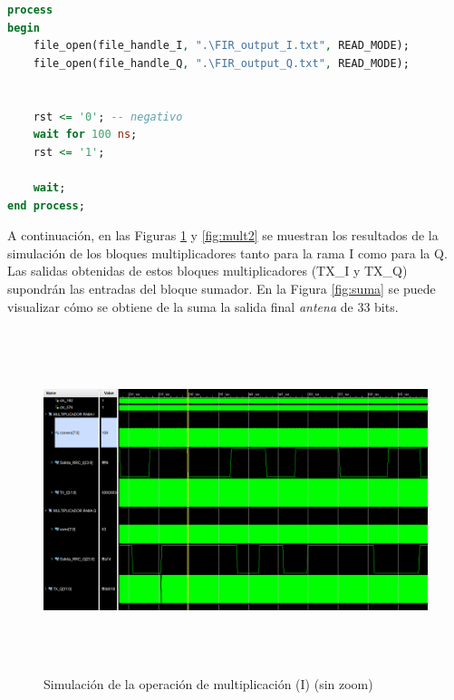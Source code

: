 \vspace{3mm}

\begin{lstlisting}[language=VHDL, style=mystyle, caption={Proceso de estimulación}]
process
begin
    file_open(file_handle_I, ".\FIR_output_I.txt", READ_MODE);
    file_open(file_handle_Q, ".\FIR_output_Q.txt", READ_MODE);
  
  
    rst <= '0'; -- negativo
    wait for 100 ns;
    rst <= '1';               

    wait;
end process;
\end{lstlisting}

\vspace{1mm}

A continuación, en las Figuras \ref{fig:mult} y \ref{fig:mult2} se muestran los resultados de la simulación de los bloques multiplicadores tanto para la rama I como para la Q. Las salidas obtenidas de estos bloques multiplicadores (TX\_I y TX\_Q) supondrán las entradas del bloque sumador. En la Figura \ref{fig:suma} se puede visualizar cómo se obtiene de la suma la salida final \textit{antena} de 33 bits.

\pagebreak

\begin{figure}
    \centering
    \includegraphics[width=1\textwidth,height=10cm]{img/simu/mult.PNG}
    \caption{Simulación de la operación de multiplicación (I) (sin zoom)}
    \label{fig:mult}
\end{figure}

\clearpage

